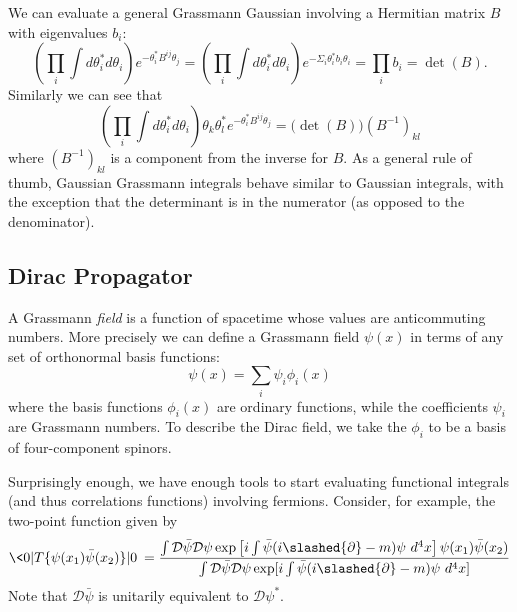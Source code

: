 We can evaluate a general Grassmann Gaussian involving a
Hermitian matrix $B$ with eigenvalues $b_{i}$:
\begin{equation}%
\left(\prod_{i}\int d\theta^{*}_{i}d\theta_{i}\right)
e^{-\theta^{*}_{i}B^{ij}\theta_{j}} = \left(\prod_{i}\int
d\theta^{*}_{i}d\theta_{i}\right)e^{-\Sigma_{i}\theta^{*}_{i}b_{i}\theta_{i}}
= \prod_{i}b_{i} = \det(B).
\end{equation}
Similarly we can see that
\begin{equation}%
\left(\prod_{i}\int d\theta^{*}_{i}d\theta_{i}\right)\theta_{k}\theta^{*}_{l}e^{-\theta^{*}_{i}B^{ij}\theta_{j}}=\Big(\det(B)\Big)(B^{-1})_{kl}
\end{equation}
where $(B^{-1})_{kl}$ is a component from the inverse for $B$. As
a general rule of thumb, Gaussian Grassmann integrals behave
similar to Gaussian integrals, with the exception that the
determinant is in the numerator (as opposed to the denominator).

\subsection{Dirac Propagator}

A Grassmann \emph{field} is a function of spacetime whose values
are anticommuting numbers. More precisely we can define a
Grassmann field $\psi(x)$ in terms of any set of orthonormal
basis functions:
\begin{equation}%
\psi(x) = \sum_{i} \psi_{i}\phi_{i}(x)
\end{equation}
where the basis functions $\phi_{i}(x)$ are ordinary functions,
while the coefficients $\psi_{i}$ are Grassmann numbers. To
describe the Dirac field, we take the $\phi_{i}$ to be a basis of
four-component spinors.

Surprisingly enough, we have enough tools to start evaluating
functional integrals (and thus correlations functions) involving
fermions. Consider, for example, the two-point function given by
\begin{equation}%
\<0|T\{\psi(x_{1})\bar{\psi}(x_{2})\}|0\> = \frac{\int\mathcal{D}\bar{\psi}\mathcal{D}\psi\exp\left[i\int\bar{\psi}(i\slashed{\partial}-m)\psi~d^{4}x\right]\psi(x_{1})\bar{\psi}(x_{2})}{\int\mathcal{D}\bar{\psi}\mathcal{D}\psi\exp[i\int\bar{\psi}(i\slashed{\partial}-m)\psi~d^{4}x]}
\end{equation}
Note that $\mathcal{D}\bar{\psi}$ is unitarily equivalent to
$\mathcal{D}\psi^{*}$. 
